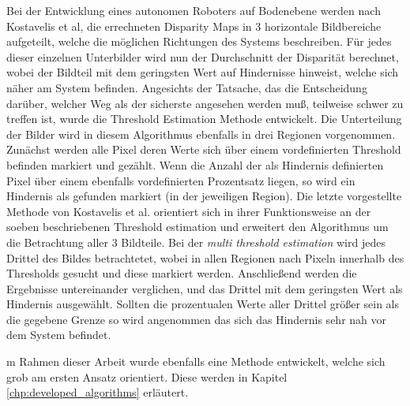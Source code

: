 \noindent
Bei der Entwicklung eines autonomen Roboters auf Bodenebene werden nach Kostavelis et al, \cite{kostavelis2010comparative} die errechneten Disparity Maps in 3 horizontale Bildbereiche aufgeteilt, welche die möglichen Richtungen des Systems beschreiben. Für jedes dieser einzelnen Unterbilder wird nun der Durchschnitt der Disparität berechnet, wobei der Bildteil mit dem geringsten Wert auf Hindernisse hinweist, welche sich näher am System befinden. Angesichts der Tatsache, das die Entscheidung darüber, welcher Weg als der sicherste angesehen werden muß, teilweise schwer zu treffen ist, wurde die Threshold Estimation Methode entwickelt.
Die Unterteilung der Bilder wird in diesem Algorithmus ebenfalls in drei Regionen vorgenommen. Zunächst werden alle Pixel deren Werte sich über einem vordefinierten Threshold befinden markiert und gezählt. 
Wenn die Anzahl der als Hindernis definierten Pixel über einem ebenfalls vordefinierten Prozentsatz liegen, so wird ein Hindernis als gefunden markiert (in der jeweiligen Region). Die letzte vorgestellte Methode von Kostavelis et al. orientiert sich in ihrer Funktionsweise an der soeben beschriebenen Threshold estimation und erweitert den Algorithmus um die Betrachtung aller 3 Bildteile.
Bei der \emph{multi threshold estimation} wird jedes Drittel des Bildes betrachtetet, wobei in allen Regionen nach Pixeln innerhalb des Thresholds gesucht und diese markiert werden. Anschließend werden die Ergebnisse untereinander verglichen, und das Drittel mit dem geringsten Wert als Hindernis ausgewählt. Sollten die prozentualen Werte aller Drittel größer sein als die gegebene Grenze so wird angenommen das sich das Hindernis sehr nah vor dem System befindet.

m Rahmen dieser Arbeit wurde ebenfalls eine Methode entwickelt, welche sich grob am ersten Ansatz orientiert. Diese werden in Kapitel \ref{chp:developed_algorithms} erläutert.\\

